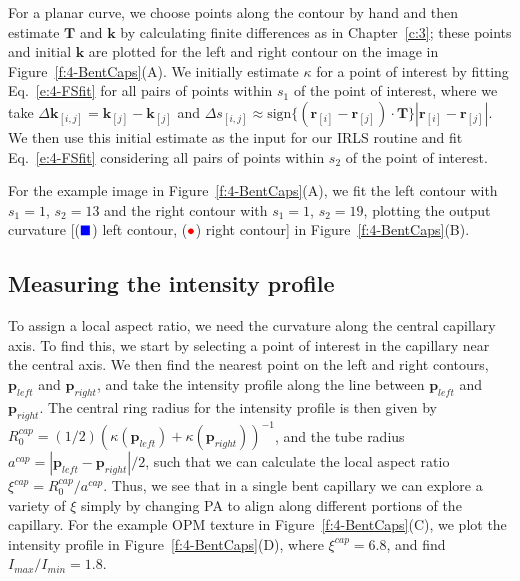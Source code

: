 For a planar curve, we choose points along the contour by hand and then estimate $\mathbf{T}$ and $\mathbf{k}$ by calculating finite differences as in Chapter~\ref{c:3}; these points and initial $\mathbf{k}$ are plotted for the left and right contour on the image in Figure~\ref{f:4-BentCaps}(A).
We initially estimate $\kappa$ for a point of interest by fitting Eq.~\ref{e:4-FSfit} for all pairs of points within $s_1$ of the point of interest, where we take $\Delta \mathbf{k}_{[i,j]} = \mathbf{k}_{[j]} - \mathbf{k}_{[j]}$ and $\Delta s_{[i,j]} \approx
\textrm{sign}\big \{ (\mathbf{r}_{[i]} - \mathbf{r}_{[j]}) \cdot \mathbf{T}\big \} |\mathbf{r}_{[i]} - \mathbf{r}_{[j]}|$.
We then use this initial estimate as the input for our IRLS routine and fit Eq.~\ref{e:4-FSfit} considering all pairs of points within $s_2$ of the point of interest.

For the example image in Figure~\ref{f:4-BentCaps}(A), we fit the left contour with $s_1 = 1$, $s_2 = 13$ and the right contour with $s_1 = 1$, $s_2 = 19$, plotting the output curvature [(${\color{blue} \blacksquare}$) left contour, (${\color{red} \bullet}$) right contour] in Figure~\ref{f:4-BentCaps}(B).

\subsection{Measuring the intensity profile}
To assign a local aspect ratio, we need the curvature along the central capillary axis.
To find this, we start by selecting a point of interest in the capillary near the central axis.
We then find the nearest point on the left and right contours, $\mathbf{p}_{left}$ and $\mathbf{p}_{right}$, and take the intensity profile along the line between $\mathbf{p}_{left}$ and $\mathbf{p}_{right}$.
The central ring radius for the intensity profile is then given by $R^{cap}_0 = (1/2)(\kappa(\mathbf{p}_{left}) + \kappa(\mathbf{p}_{right}))^{-1}$, and the tube radius $a^{cap} = |\mathbf{p}_{left} - \mathbf{p}_{right}|/2$, such that we can calculate the local aspect ratio $\xi^{cap} = R^{cap}_0/a^{cap}$.
Thus, we see that in a single bent capillary we can explore a variety of $\xi$ simply by changing PA to align along different portions of the capillary.
For the example OPM texture in Figure~\ref{f:4-BentCaps}(C), we plot the intensity profile in Figure~\ref{f:4-BentCaps}(D), where $\xi^{cap} = 6.8$, and find $I_{max}/I_{min} = 1.8$.


